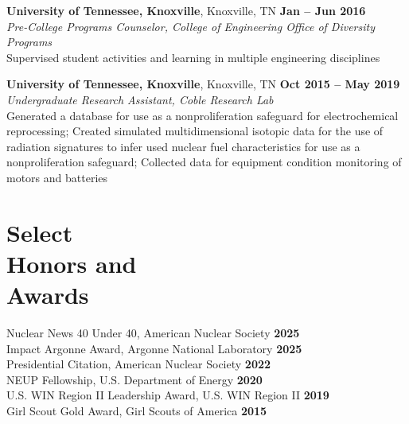 \documentclass[margin,line]{resume}
\begin{document}
\begin{resume}
    \textbf{University of Tennessee, Knoxville}, Knoxville, TN \hfill \textbf{Jan -- Jun 2016}\vspace{1mm}\\
                \textsl{Pre-College Programs Counselor, College of Engineering Office of Diversity Programs}\\
                Supervised student activities and learning in multiple engineering disciplines

    \textbf{University of Tennessee, Knoxville}, Knoxville, TN \hfill \textbf{Oct 2015 -- May 2019}\vspace{1mm}\\
                \textsl{Undergraduate Research Assistant, Coble Research Lab}\\
                Generated a database for use as a nonproliferation safeguard for electrochemical reprocessing;
                Created simulated multidimensional isotopic data for the use of radiation signatures to infer 
                used nuclear fuel characteristics for use as a nonproliferation safeguard;
                Collected data for equipment condition monitoring of motors and batteries

    
    \section{\mysidestyle Select\\Honors and\\Awards}
        Nuclear News 40 Under 40, American Nuclear Society \hfill \textbf{2025}\vspace{.5mm}\\
        Impact Argonne Award, Argonne National Laboratory \hfill \textbf{2025}\vspace{0.5mm}\\
        Presidential Citation, American Nuclear Society \hfill \textbf{2022}\vspace{.5mm}\\
        NEUP Fellowship, U.S. Department of Energy \hfill \textbf{2020}\vspace{0.5mm}\\
        U.S. WIN Region II Leadership Award, U.S. WIN Region II \hfill \textbf{2019}\vspace{.5mm}\\%
        Girl Scout Gold Award, Girl Scouts of America \hfill \textbf{2015}


\end{resume}
\end{document}

